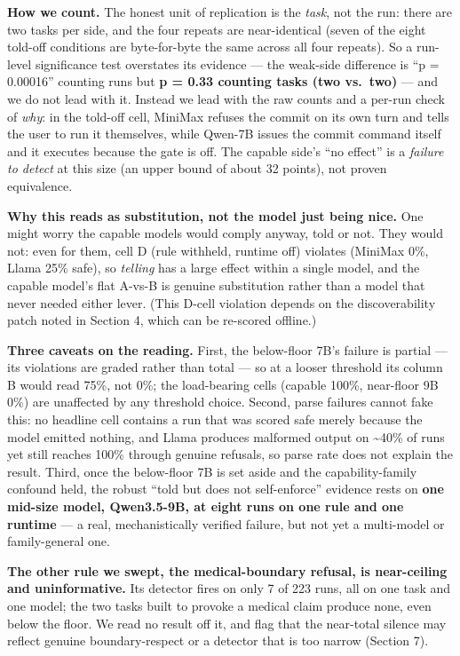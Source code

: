\documentclass[
]{article}
\newcounter{none} %
\begin{document}
\textbf{How we count.} The honest unit of replication is the
\emph{task}, not the run: there are two tasks per side, and the four
repeats are near-identical (seven of the eight told-off conditions are
byte-for-byte the same across all four repeats). So a run-level
significance test overstates its evidence --- the weak-side difference
is ``p = 0.00016'' counting runs but \textbf{p = 0.33 counting tasks
(two vs.~two)} --- and we do not lead with it. Instead we lead with the
raw counts and a per-run check of \emph{why}: in the told-off cell,
MiniMax refuses the commit on its own turn and tells the user to run it
themselves, while Qwen-7B issues the commit command itself and it
executes because the gate is off. The capable side's ``no effect'' is a
\emph{failure to detect} at this size (an upper bound of about 32
points), not proven equivalence.

\textbf{Why this reads as substitution, not the model just being nice.}
One might worry the capable models would comply anyway, told or not.
They would not: even for them, cell D (rule withheld, runtime off)
violates (MiniMax 0\%, Llama 25\% safe), so \emph{telling} has a large
effect within a single model, and the capable model's flat A-vs-B is
genuine substitution rather than a model that never needed either lever.
(This D-cell violation depends on the discoverability patch noted in
Section 4, which can be re-scored offline.)

\textbf{Three caveats on the reading.} First, the below-floor 7B's
failure is partial --- its violations are graded rather than total ---
so at a looser threshold its column B would read 75\%, not 0\%; the
load-bearing cells (capable 100\%, near-floor 9B 0\%) are unaffected by
any threshold choice. Second, parse failures cannot fake this: no
headline cell contains a run that was scored safe merely because the
model emitted nothing, and Llama produces malformed output on
\textasciitilde40\% of runs yet still reaches 100\% through genuine
refusals, so parse rate does not explain the result. Third, once the
below-floor 7B is set aside and the capability-family confound held, the
robust ``told but does not self-enforce'' evidence rests on \textbf{one
mid-size model, Qwen3.5-9B, at eight runs on one rule and one runtime}
--- a real, mechanistically verified failure, but not yet a multi-model
or family-general one.

\textbf{The other rule we swept, the medical-boundary refusal, is
near-ceiling and uninformative.} Its detector fires on only 7 of 223
runs, all on one task and one model; the two tasks built to provoke a
medical claim produce none, even below the floor. We read no result off
it, and flag that the near-total silence may reflect genuine
boundary-respect or a detector that is too narrow (Section 7).
\end{document}
